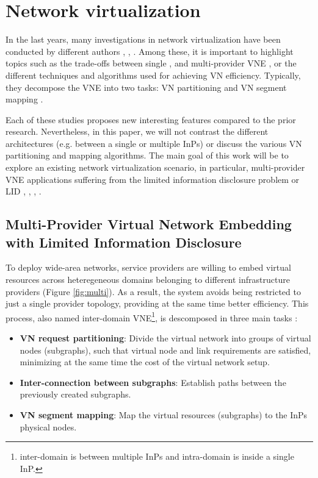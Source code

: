 \section{Network virtualization}

In the last years, many investigations in network virtualization have been conducted by different authors \citep{houidi2011virtual}, \citep{zhu2008cabernet}, \citep{chowdhury2009virtual}. Among these, it is important to highlight topics such as the trade-offs between single \citep{chowdhury2009virtual}, \citep{houidi2008distributed} and multi-provider VNE \citep{dietrich2017multi}, or the different techniques and algorithms used for achieving VN efficiency. Typically, they decompose the VNE into two tasks: VN partitioning and VN segment mapping \citep{fischer2013virtual}. 

Each of these studies proposes new interesting features compared to the prior research. Nevertheless, in this paper, we will not contrast the different architectures (e.g. between a single or multiple InPs) or discuss the various VN partitioning and mapping algorithms. The main goal of this work will be to explore an existing network virtualization scenario, in particular, multi-provider VNE applications suffering from the limited information disclosure problem or LID \citep{dietrich2017multi}, \citep{zaheer2010multi}, \citep{esposito2013general}, \citep{chowdhury2010polyvine}.

\subsection{Multi-Provider Virtual Network Embedding with Limited Information Disclosure}

To deploy wide-area networks, service providers are willing to embed virtual resources across heteregeneous domains belonging to different infrastructure providers (Figure \ref{fig:multi}). As a result, the system avoids being restricted to just a single provider topology, providing at the same time better efficiency. This process, also named inter-domain VNE\footnote{inter-domain is between multiple InPs and intra-domain is inside a single InP.}, is descomposed in three main tasks \citep{chowdhury2010polyvine}:

\begin{itemize}
	\item \textbf{VN request partitioning}: Divide the virtual network into groups of virtual nodes (subgraphs), such that virtual node and link requirements are satisfied, minimizing at the same time the cost of the virtual network setup.
		\item \textbf{Inter-connection between subgraphs}: Establish paths between the previously created subgraphs.
	\item \textbf{VN segment mapping}: Map the virtual resources (subgraphs) to the InPs physical nodes.
\end{itemize}

